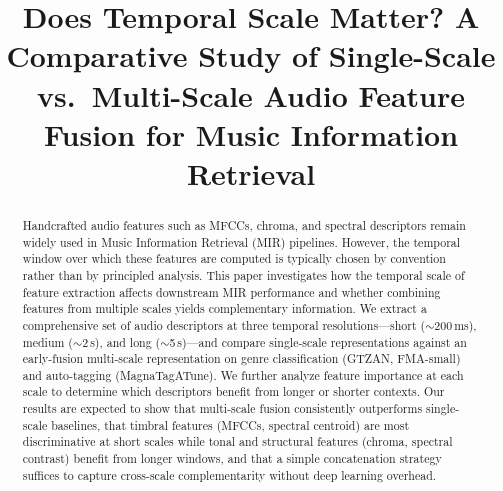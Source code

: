 \documentclass[conference]{IEEEtran}
\begin{document}
\title{Does Temporal Scale Matter? A Comparative Study of Single-Scale vs.\ Multi-Scale Audio Feature Fusion for Music Information Retrieval}

\author{
\and
{}
}

\maketitle

\begin{abstract}
Handcrafted audio features such as MFCCs, chroma, and spectral descriptors remain widely used in Music Information Retrieval (MIR) pipelines.
However, the temporal window over which these features are computed is typically chosen by convention rather than by principled analysis.
This paper investigates how the temporal scale of feature extraction affects downstream MIR performance and whether combining features from multiple scales yields complementary information.
We extract a comprehensive set of audio descriptors at three temporal resolutions---short ($\sim$200\,ms), medium ($\sim$2\,s), and long ($\sim$5\,s)---and compare single-scale representations against an early-fusion multi-scale representation on genre classification (GTZAN, FMA-small) and auto-tagging (MagnaTagATune).
We further analyze feature importance at each scale to determine which descriptors benefit from longer or shorter contexts.
Our results are expected to show that multi-scale fusion consistently outperforms single-scale baselines, that timbral features (MFCCs, spectral centroid) are most discriminative at short scales while tonal and structural features (chroma, spectral contrast) benefit from longer windows, and that a simple concatenation strategy suffices to capture cross-scale complementarity without deep learning overhead.
\end{abstract}
\end{document}

